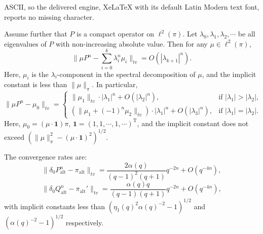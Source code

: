 \documentclass[10pt,a4paper]{amsart}
\newcommand{\T}{\mathrm{T}}
\newcommand{\alt}{{\mathrm{alt}}}
\begin{document}
ASCII, so the delivered engine, XeLaTeX with its default Latin Modern text font, reports no missing character.
\begin{theorem}\label{thm:main_thm_spec}
Assume further that $P$ is a compact operator on $\ell^2(\pi)$. Let $\lambda_0, \lambda_1, \lambda_2, \cdots$ be all eigenvalues of $P$ with non-increasing absolute value. Then for any $\mu \in \ell^2(\pi)$,
\[
\|\mu P^n - \sum_{i=0}^{k} \lambda_i^n \mu_i\|_{tv} = O(|\lambda_{k+1}|^{n}).
\]
Here, $\mu_i$ is the $\lambda_i$-component in the spectral decomposition of $\mu$, and the implicit constant is less than $\|\mu\|_\pi$. In particular,
\[
\|\mu P^n - \mu_0\|_{tv} = \begin{cases}
    \|\mu_1\|_{tv} \cdot |\lambda_1|^{n} + O(|\lambda_2|^{n}), & \text{if } |\lambda_1| > |\lambda_2|, \\
    (\|\mu_1 + (-1)^n \mu_2\|_{tv}) \cdot |\lambda_1|^{n} + O(|\lambda_3|^{n}), & \text{if } |\lambda_1| = |\lambda_2|.
  \end{cases}
\]
Here, $\mu_0 = (\mu \cdot \mathbf{1}) \pi$, $\mathbf{1} = (1, 1,\cdots, 1, \cdots)^\T$, and the implicit constant does not exceed $\left(\|\mu\|_\pi^2 - (\mu \cdot \mathbf{1})^2\right)^{1/2}$.
\end{theorem}

\begin{corollary}\label{cor:alt_converg}
The convergence rates are:
\[
\|\delta_0 P_\alt^n - \pi_\alt\|_{tv} = \frac{2\alpha(q)}{(q-1)^2(q+1)} q^{-2n} + O(q^{-4n}),
\]
\[
\|\delta_0 Q_\alt^n - \pi_\alt'\|_{tv} = \frac{\alpha(q) q}{(q-1)(q+1)} q^{-2n} + O(q^{-4n}),
\]
with implicit constants less than $(\eta_1(q)^2\alpha(q)^{-2}-1)^{1/2}$ and $(\alpha(q)^{-2}-1)^{1/2}$ respectively.
\end{corollary}
\end{document}
